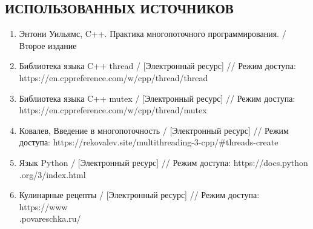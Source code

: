 \documentclass{article}
\begin{document}
\clearpage\begin{center}\section*{ ИСПОЛЬЗОВАННЫХ ИСТОЧНИКОВ}\end{center}
\begin{enumerate}
	\item Энтони Уильямс, C++. Практика многопоточного программирования. / Второе издание
	\item	Библиотека языка C++ thread / [Электронный ресурс] // Режим доступа: \\https://en.cppreference.com/w/cpp/thread/thread
	\item	Библиотека языка C++ mutex / [Электронный ресурс] // Режим доступа: https://en.cppreference.com/w/cpp/thread/mutex
	\item Ковалев, Введение в многопоточность / [Электронный ресурс] // Режим доступа: https://rekovalev.site/multithreading-3-cpp/\#threads-create
	\item Язык Python / [Электронный ресурс] // Режим доступа: https://docs.python\\.org/3/index.html
	\item Кулинарные рецепты / [Электронный ресурс] // Режим доступа: https://www\\.povareschka.ru/
 \end{enumerate}
\end{document}
